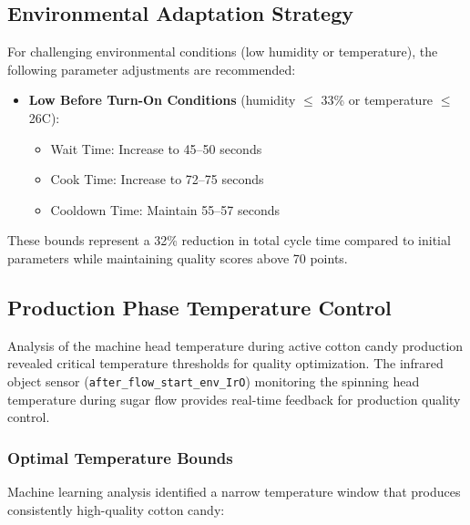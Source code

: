\subsection{Environmental Adaptation Strategy}

For challenging environmental conditions (low humidity or temperature), the following parameter adjustments are recommended:

\begin{itemize}
    \item \textbf{Low Before Turn-On Conditions} (humidity $\leq$ 33\% or temperature $\leq$ 26\textdegree C):
    \begin{itemize}
        \item Wait Time: Increase to 45--50 seconds
        \item Cook Time: Increase to 72--75 seconds  
        \item Cooldown Time: Maintain 55--57 seconds
    \end{itemize}
\end{itemize}

These bounds represent a 32\% reduction in total cycle time compared to initial parameters while maintaining quality scores above 70 points.

\subsection{Production Phase Temperature Control}

Analysis of the machine head temperature during active cotton candy production revealed critical temperature thresholds for quality optimization. The infrared object sensor (\texttt{after\_flow\_start\_env\_IrO}) monitoring the spinning head temperature during sugar flow provides real-time feedback for production quality control.

\subsubsection{Optimal Temperature Bounds}

Machine learning analysis identified a narrow temperature window that produces consistently high-quality cotton candy:

